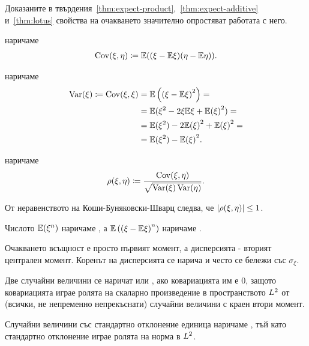 \documentclass[numbers=endperiod, bibliography=totocnumbered]{scrartcl}
\begin{document}
Доказаните в твърдения~\ref{thm:expect-product},~\ref{thm:expect-additive} и~\ref{thm:lotus} свойства на очакването значително опростяват работата с него.

\begin{definition}
   наричаме
  \begin{align*}
    \operatorname{Cov}(\xi, \eta)
    \coloneqq
    \mathbb{E}((\xi - \mathbb{E} \xi) (\eta - \mathbb{E} \eta)).
  \end{align*}

   наричаме
  \begin{align*}
    \operatorname{Var}(\xi)
    \coloneqq
    \operatorname{Cov}(\xi, \xi)
    &=
    \mathbb{E} \left({(\xi - \mathbb{E} \xi)}^2 \right)
    = \\ &=
    \mathbb{E}(\xi^2 - 2 \xi \mathbb{E} \xi + {\mathbb{E}(\xi)}^2)
    = \\ &=
    \mathbb{E}(\xi^2) - 2 {\mathbb{E}(\xi)}^2 + {\mathbb{E}(\xi)}^2
    = \\ &=
    \mathbb{E}(\xi^2) - {\mathbb{E}(\xi)}^2.
  \end{align*}

   наричаме
  \begin{align*}
    \operatorname{\rho}(\xi, \eta)
    \coloneqq
    \frac {\operatorname{Cov}(\xi, \eta)} {\sqrt{\operatorname{Var}(\xi) \operatorname{Var}(\eta)}}.
  \end{align*}

  От неравенството на Коши-Буняковски-Шварц следва, че \( \left\vert \operatorname{\rho}(\xi, \eta) \right\vert \leq 1 \).

  Числото \( \mathbb{E}(\xi^n) \) наричаме , а \( \mathbb{E} \left( {(\xi - \mathbb{E} \xi)}^n \right) \) наричаме .

  Очакването всъщност е просто първият момент, а дисперсията - вторият централен момент. Коренът на дисперсията се нарича  и често се бележи със \( \sigma_\xi \).

  Две случайни величини се наричат  или , ако ковариацията им е \( 0 \), защото ковариацията играе ролята на скаларно произведение в пространството \( L^2 \) от (всички, не непременно непрекъснати) случайни величини с краен втори момент.

  Случайни величини със стандартно отклонение единица наричаме , тъй като стандартно отклонение играе ролята на норма в \( L^2 \).
\end{definition}
\end{document}
